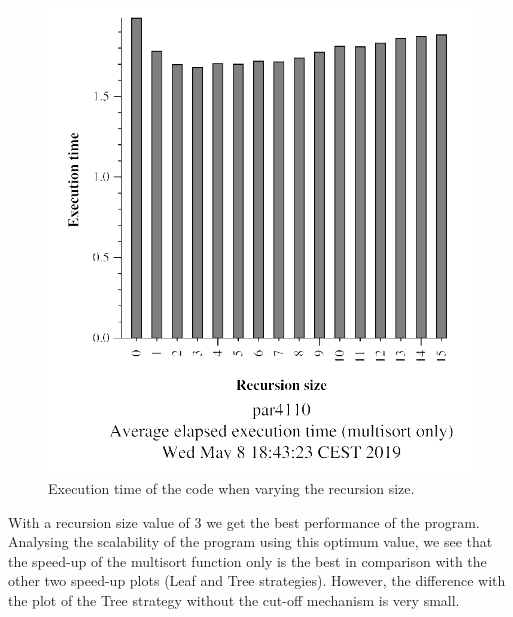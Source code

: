 \documentclass[12pt, a4paper]{article}
\begin{document}
\begin{figure}[H]
	\centering
	\includegraphics[scale=0.55]{./images/S2/multisort-omp-4-cutoff}
	
	\label{fig:multivalues_cutoff}
	\caption{Execution time of the code when varying the recursion size.}
\end{figure}

With a recursion size value of 3 we get the best performance of the program. Analysing the scalability of the program using this optimum value, we see that the speed-up of the multisort function only is the best in comparison with the other two speed-up plots (Leaf and Tree strategies). However, the difference with the plot of the Tree strategy without the cut-off mechanism is very small.
\end{document}
